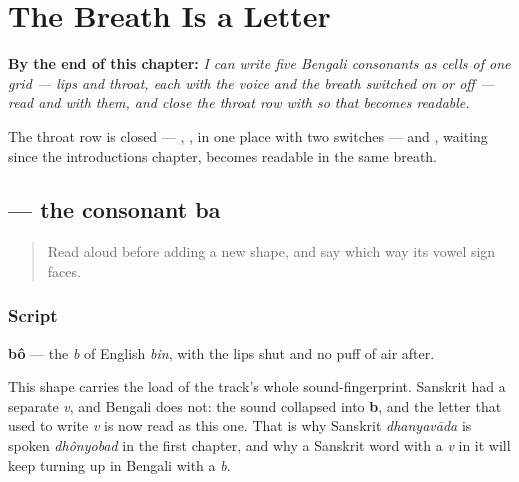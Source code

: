 
\chapter{The Breath Is a Letter}
\label{ch:bn-breath-is-a-letter}

\begin{chapteropening}
\textbf{By the end of this chapter:} \emph{I can write five Bengali consonants as cells of one grid — lips and throat, each with the voice and the breath switched on or off — read  and  with them, and close the throat row with  so that  becomes readable.}

The throat row is closed — , ,  in one place with two switches — and , waiting since the introductions chapter, becomes readable in the same breath.
\end{chapteropening}

\section[\texorpdfstring{\bn{ব} (bô)}{ব (bô)}]{ — the consonant ba}

\label{lesson:BN-W03-ba}



\begin{quote}
Read \textbf{} aloud before adding a new shape, and say which way its vowel sign faces.
\end{quote}

\subsection*{Script}

\begin{quote}
\end{quote}

\textbf{bô} — the \emph{b} of English \emph{bin}, with the lips shut and no puff of air after.

This shape carries the load of the track's whole sound-fingerprint. Sanskrit had a separate \emph{v}, and Bengali does not: the sound collapsed into \textbf{b}, and the letter that used to write \emph{v} is now read as this one. That is why Sanskrit \emph{dhanyavāda} is spoken \emph{dhônyobad} in the first chapter, and why a Sanskrit word with a \emph{v} in it will keep turning up in Bengali with a \emph{b}.

